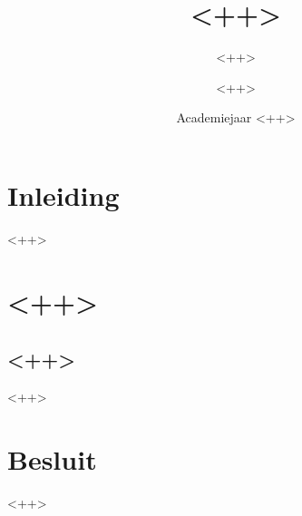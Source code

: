 \documentclass[a4paper,twoside,kul]{kulakreport}
\title{<++>}
\subtitle{<++>}
\author{<++>}
\institute{<++>}
\date{Academiejaar <++>}
\begin{document}

\titlepage

\tableofcontents

\chapter*{Inleiding}

    <++>

\chapter{<++>}
\section{<++>}

    <++>

\chapter*{Besluit}

    <++>
\end{document}
